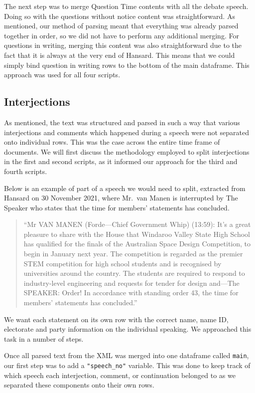 \documentclass[
  letterpaper,
  DIV=11,
  numbers=noendperiod]{scrartcl}
\begin{document}
The next step was to merge Question Time contents with all the debate
speech. Doing so with the questions without notice content was
straightforward. As mentioned, our method of parsing meant that
everything was already parsed together in order, so we did not have to
perform any additional merging. For questions in writing, merging this
content was also straightforward due to the fact that it is always at
the very end of Hansard. This means that we could simply bind question
in writing rows to the bottom of the main dataframe. This approach was
used for all four scripts.

\hypertarget{sec-interject}{%
\subsection{Interjections}\label{sec-interject}}

As mentioned, the text was structured and parsed in such a way that
various interjections and comments which happened during a speech were
not separated onto individual rows. This was the case across the entire
time frame of documents. We will first discuss the methodology employed
to split interjections in the first and second scripts, as it informed
our approach for the third and fourth scripts.

Below is an example of part of a speech we would need to split,
extracted from Hansard on 30 November 2021, where Mr.~van Manen is
interrupted by The Speaker who states that the time for members'
statements has concluded.

\begin{quote}
``Mr VAN MANEN (Forde---Chief Government Whip) (13:59): It's a great
pleasure to share with the House that Windaroo Valley State High School
has qualified for the finals of the Australian Space Design Competition,
to begin in January next year. The competition is regarded as the
premier STEM competition for high school students and is recognised by
universities around the country. The students are required to respond to
industry-level engineering and requests for tender for design and---The
SPEAKER: Order! In accordance with standing order 43, the time for
members' statements has concluded.''
\end{quote}

We want each statement on its own row with the correct name, name ID,
electorate and party information on the individual speaking. We
approached this task in a number of steps.

Once all parsed text from the XML was merged into one dataframe called
\texttt{main}, our first step was to add a \texttt{"speech\_no"}
variable. This was done to keep track of which speech each interjection,
comment, or continuation belonged to as we separated these components
onto their own rows.
\end{document}
